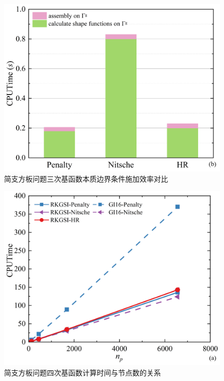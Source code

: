 \begin{figure}[H]
    \centering
    \includegraphics[scale=0.5]{figure/PHR/R/Cefficiency.png}
    \caption{简支方板问题三次基函数本质边界条件施加效率对比}
\end{figure}
\newpage
\begin{figure}[H]
    \centering
    \includegraphics[scale=0.5]{figure/PHR/R/Qcputime.png}
    \caption{简支方板问题四次基函数计算时间与节点数的关系}
\end{figure}
